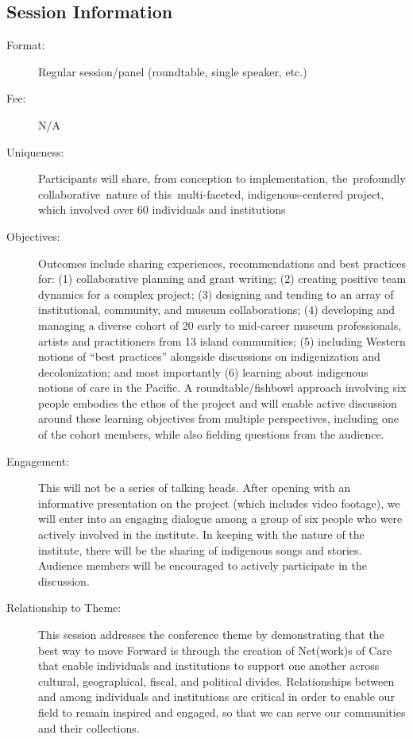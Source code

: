 \documentclass{report}
\begin{document}
              \subsection*{Session Information}
                \begin{description}
                  \item [Format:] Regular session/panel (roundtable, single speaker, etc.)
							    
								  \item [Fee:]N/A
							     
							    \item [Uniqueness:]Participants will share, from conception to implementation, the profoundly collaborative nature of this multi-faceted, indigenous-centered project, which involved over 60 individuals and institutions
							    \item [Objectives:]Outcomes include sharing experiences, recommendations and best practices for: (1) collaborative planning and grant writing; (2) creating positive team dynamics for a complex project; (3) designing and tending to an array of institutional, community, and museum collaborations; (4) developing and managing a diverse cohort of 20 early to mid-career museum professionals, artists and practitioners from 13 island communities; (5) including Western notions of “best practices” alongside discussions on indigenization and decolonization; and most importantly (6) learning about indigenous notions of care in the Pacific. A roundtable/fishbowl approach involving six people embodies the ethos of the project and will enable active discussion around these learning objectives from multiple perspectives, including one of the cohort members, while also fielding questions from the audience.
							    \item [Engagement:]This will not be a series of talking heads. After opening with an informative presentation on the project (which includes video footage), we will enter into an engaging dialogue among a group of six people who were actively involved in the institute. In keeping with the nature of the institute, there will be the sharing of indigenous songs and stories. Audience members will be encouraged to actively participate in the discussion.
							    \item [Relationship to Theme:]This session addresses the conference theme by demonstrating that the best way to move Forward is through the creation of  Net(work)s of Care that enable individuals and institutions to support one another across cultural, geographical, fiscal, and political divides. Relationships between and among individuals and institutions are critical in order to enable our field to remain inspired and engaged, so that we can serve our communities and their collections.
							    

\end{description}
\end{document}
